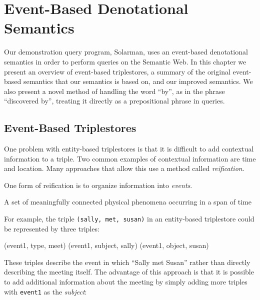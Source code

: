 \documentclass[../main.tex]{subfiles}
\begin{document}
	
\setlength{\abovedisplayskip}{0pt}
\setlength{\belowdisplayskip}{12pt}
\setlength{\abovedisplayshortskip}{0pt}
\setlength{\belowdisplayshortskip}{0pt} 

\chapter {Event-Based Denotational Semantics}

\label{chapter:semantics}

Our demonstration query program, Solarman, uses an event-based denotational semantics in order to perform queries on the Semantic Web.  In this chapter we present
an overview of event-based triplestores, a summary of the original event-based semantics that our semantics is based on, and our improved semantics.
We also present a novel method of handling the word ``by'', as in the phrase ``discovered by'', treating it directly as a prepositional phrase in queries.

\section{Event-Based Triplestores}

One problem with entity-based triplestores is that it is difficult to add contextual information to a triple.  Two common examples of contextual information are time and location.  Many approaches that allow this use a method called {\em reification}\cite{antoniou2004semantic}. %

One form of reification is to organize information into {\em events}.

\begin{definition}[Event]
	A set of meaningfully connected physical phenomena occurring in a span of time
\end{definition}

For example, the triple \texttt{(sally, met, susan)} in an entity-based triplestore could be represented by three triples:

\begin{code}
	(event1, type, meet)
	(event1, subject, sally)
	(event1, object, susan)
\end{code}

These triples describe the event in which ``Sally met Susan'' rather than directly describing the meeting itself.  The advantage of this approach is that it is possible to add additional information about the meeting by simply adding more triples with \texttt{event1} as the {\em subject}:
\end{document}
